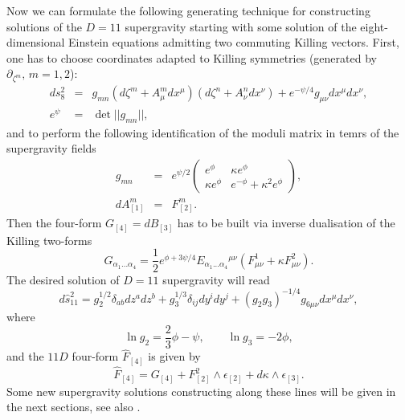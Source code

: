 \documentclass[a4paper,12pt]{article}
\begin{document}
Now we can formulate the following generating technique for
constructing solutions of the $D=11$ supergravity starting with
some solution of the eight-dimensional Einstein equations
admitting two commuting Killing vectors. First, one has to
choose   coordinates adapted to Killing symmetries (generated by
$\partial_{\zeta^m},\,m=1,2$):
\begin{eqnarray}
ds_{8}^2 &=& g_{mn} \left( d\zeta^m + A^m_{\mu} dx^\mu \right)
\left( d\zeta^n + A^n_{\nu} dx^\nu \right)
+ e^{-\psi/4} g_{\mu\nu} dx^\mu dx^\nu, \nonumber\\
e^{\psi} &=& \det ||g_{mn}||, \label{hab}
\end{eqnarray}
and to perform the following identification of the moduli matrix
in temrs of the supergravity fields
\begin{eqnarray}
g_{mn} &=& e^{\psi/2}
  \left( \begin{array}{cc}
    e^\phi & \kappa e^\phi \\
    \kappa e^\phi & e^{-\phi}+\kappa^2 e^\phi
  \end{array} \right), \nonumber \\
dA^m_{[1]} &=& F^m_{[2]}. \label{8DV}
\end{eqnarray}
Then the four-form $G_{[4]} = dB_{[3]}$ has to be built via
inverse dualisation of the Killing two-forms
\begin{equation}
G_{\alpha_1...\alpha_4} = \frac12 e^{\phi+3\psi/4}
E_{\alpha_1...\alpha_4}{}^{\mu\nu} \left( F^1_{\mu\nu} + \kappa
F^2_{\mu\nu} \right).
\end{equation}
The desired solution of $D=11$ supergravity will read
\begin{equation}\label{aNZ}
d \hat s_{11}^2 = g_2^{1/2} \delta_{ab} dz^a dz^b + g_3^{1/3}
\delta_{ij} dy^i dy^j + (g_2 g_3)^{-1/4} g_{6\mu\nu} dx^\mu
dx^\nu,
\end{equation}
where
\begin{equation}
\ln g_2 = \frac23 \phi - \psi, \qquad \ln g_3 = -2 \phi,
\end{equation}
and the $11D$ four-form $\hat F_{[4]}$ is given by
\begin{equation} \label{fANZ}
\hat F_{[4]} = G_{[4]} + F^2_{[2]} \wedge \epsilon_{[2]} +
d\kappa \wedge \epsilon_{[3]}.
\end{equation}
Some new supergravity solutions constructing along these lines
will be given in the next sections, see also
\cite{ChGaSh00,ChGaSh99,Ch00}.
\end{document}

